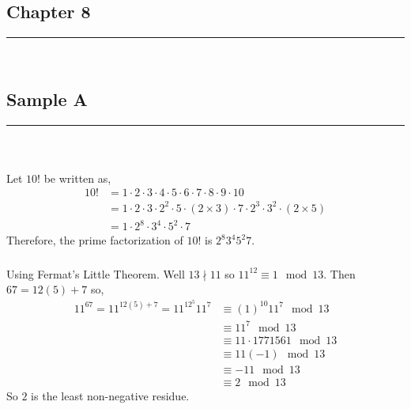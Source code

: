 \documentclass[class=article, crop=false]{standalone}
\begin{document}
\setcounter{subsection}{7}
\subsection{Chapter 8}
\rule{\textwidth}{1pt}\\


\setcounter{section}{5}
\setcounter{subsection}{0}

\subsection{Sample A}
\rule{\textwidth}{1pt}\\
\subsubsection{}
Let $10!$ be written as,
	\begin{align*}
		10! &= 1\cdot 2\cdot 3\cdot 4\cdot 5\cdot 6\cdot 7\cdot 8\cdot 9\cdot 10 \\
		&= 1\cdot 2\cdot 3\cdot 2^2\cdot 5\cdot (2\times 3)\cdot 7\cdot 2^3\cdot 3^2\cdot (2\times 5) \\
		&= 1\cdot 2^8\cdot 3^4\cdot 5^2\cdot 7
	\end{align*}
	Therefore, the prime factorization of $10!$ is $2^8 3^4 5^2 7$.

\subsubsection{}
Using Fermat's Little Theorem. 
	Well $13\nmid 11$ so $11^{12} \equiv 1\mod 13$. Then $67= 12(5) + 7$ so,
	\begin{align*}
		11^{67} = 11^{12(5)+7} = 11^{12^5}11^7 &\equiv (1)^{10} 11^{7} \mod 13 \\
		&\equiv 11^7 \mod 13 \\
		&\equiv 11 \cdot 1771561 \mod 13 \\
		&\equiv 11 (-1) \mod 13 \\
		&\equiv -11 \mod 13 \\
		&\equiv 2 \mod 13
	\end{align*}
	So $2$ is the least non-negative residue.
\end{document}
